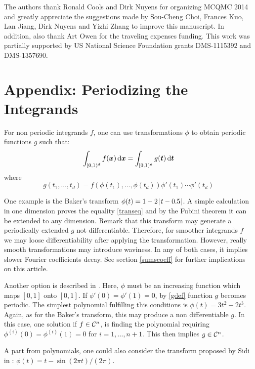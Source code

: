 \documentclass[graybox]{svmult}
\newcommand{\bst}{\boldsymbol{t}}    %
\newcommand{\bsx}{\boldsymbol{x}}    %
\begin{document}
\begin{acknowledgement}
The authors thank Ronald Cools and Dirk Nuyens for organizing MCQMC 2014 and greatly appreciate the suggestions made by Sou-Cheng Choi, Frances Kuo, Lan Jiang, Dirk Nuyens and Yizhi Zhang to improve this manuscript. In addition, also thank Art Owen for the traveling expenses funding.
This work was partially supported by US National Science Foundation grants DMS-1115392 and DMS-1357690. 
\end{acknowledgement}




\section*{Appendix: Periodizing the Integrands}\label{apendixperiodizing}
For non periodic integrands $f$, one can use transformations $\phi$ to obtain periodic functions $g$ such that:
\begin{equation}\label{transeq}
\int_{\cube} f(\bsx)  \, \dif \bsx=\int_{\cube} g(\bst)  \, \dif \bst
\end{equation}
where
\begin{equation}\label{gdef}
g(t_1,\dots,t_d)=f(\phi(t_1),\dots,\phi(t_d))\phi'(t_1)\cdots\phi'(t_d)
\end{equation}

One example is the Baker's transform $\phi(t)=1-2\left | t-0.5 \right |$. A simple calculation in one dimension proves the equality \eqref{transeq} and by the Fubini theorem it can be extended to any dimension. Remark that this transform may generate a periodically extended $g$ not differentiable. Therefore, for smoother integrands $f$ we may loose differentiability after applying the transformation. However, really smooth transformations may introduce waviness. In any of both cases, it implies slower Fourier coefficients decay. See section \ref{sumscoeff} for further implications on this article.

Another option is described in \cite[Sec. 2.12]{SloJoe94}. Here, $\phi$ must be an increasing function which maps $[0,1]$ onto $[0,1]$. If $\phi'(0)=\phi'(1)=0$, by \eqref{gdef} function $g$ becomes periodic. The simplest polynomial fulfilling this conditions is $\phi(t)=3t^2-2t^3$. Again, as for the Baker's transform, this may produce a non differentiable $g$. In this case, one solution if $f\in\mathcal{C}^n$, is finding the polynomial requiring $\phi^{(i)}(0)=\phi^{(i)}(1)=0$ for $i=1,\dots,n+1$. This then implies $g\in\mathcal{C}^n$.

A part from polynomials, one could also consider the transform proposed by Sidi in \cite{Sid93}: $\phi(t)=t-\sin(2\pi t)/(2\pi)$.
\end{document}
